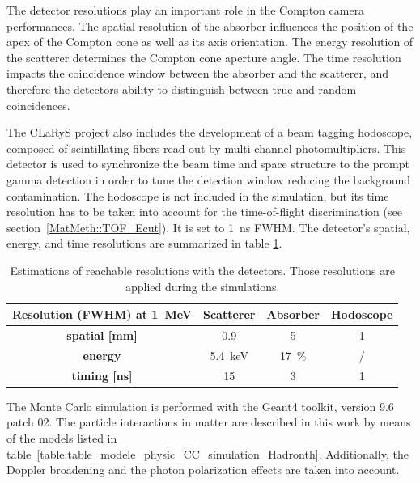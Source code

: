 The detector resolutions play an important role in the Compton camera performances. The spatial resolution of the absorber influences the position of the apex of the Compton cone as well as its axis orientation. The energy resolution of the scatterer determines the Compton cone aperture angle. The time resolution impacts the coincidence window between the absorber and the scatterer, and therefore the detectors ability to distinguish between true and random coincidences.

The CLaRyS project also includes the development of a beam tagging hodoscope, composed of scintillating fibers read out by multi-channel photomultipliers. This detector is used to synchronize the beam time and space structure to the prompt gamma detection in order to tune the detection window reducing the background contamination. The hodoscope is not included in the simulation, but its time resolution has to be taken into account for the time-of-flight discrimination (see section~\ref{MatMeth::TOF_Ecut}). It is set to 1~ns FWHM. 
The detector's spatial, energy, and time resolutions are summarized in table \ref{table:table_resolution_detecteurs_CC_simulation_Hadronth}.

\begin{table}
\centering
\caption{Estimations of reachable resolutions with the detectors. Those resolutions are applied during the simulations.}
\begin{tabular}{cccc}
\hline
\textbf{Resolution (FWHM) at 1~MeV} & \textbf{Scatterer} & \textbf{Absorber} & \textbf{Hodoscope}\\
\hline 
\textbf{spatial [mm]	}			 &     0.9		 &  5 &	 1\\
\textbf{energy}				&	5.4~keV		&  17~\%	&	/\\
\textbf{timing [ns]}	        		&	15			&	3 	&  1\\
\hline
\end{tabular}
\label{table:table_resolution_detecteurs_CC_simulation_Hadronth}
\end{table}
    
The Monte Carlo simulation is performed with the Geant4 toolkit, version 9.6 patch 02. 
The particle interactions in matter are described in this work by means of the models listed in table~\ref{table:table_modele_physic_CC_simulation_Hadronth}. Additionally, the Doppler broadening and the photon polarization effects are taken into account.
 

